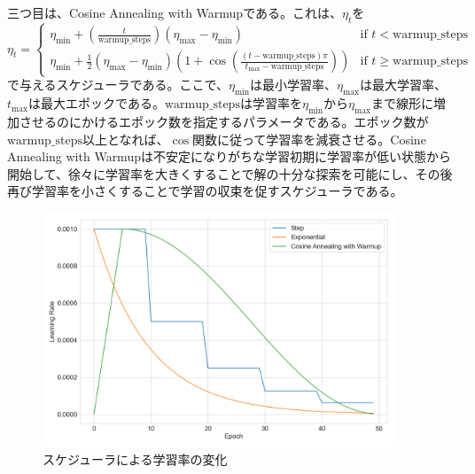 \documentclass[12pt]{jarticle}
\numberwithin{equation}{section}    %
\numberwithin{figure}{section}      %
\numberwithin{table}{section}      %
\begin{document}
三つ目は、Cosine Annealing with Warmupである。これは、$\eta_{t}$を
\begin{equation}
    \eta_{t} =
    \begin{cases}
        \eta_{\text{min}} + \left( \frac{t}{\text{warmup\_steps}} \right) (\eta_{\text{max}} - \eta_{\text{min}})                                                                                  & \text{if $t < \text{warmup\_steps}$}   \\
        \eta_{\text{min}} + \frac{1}{2} (\eta_{\text{max}} - \eta_{\text{min}}) \left( 1 + \cos \left( \frac{(t - \text{warmup\_steps})\pi}{t_{\text{max}} - \text{warmup\_steps}} \right) \right) & \text{if $t \ge \text{warmup\_steps}$}
    \end{cases}
\end{equation}
で与えるスケジューラである。ここで、$\eta_{\text{min}}$は最小学習率、$\eta_{\text{max}}$は最大学習率、$t_{\text{max}}$は最大エポックである。$\text{warmup\_steps}$は学習率を$\eta_{\text{min}}$から$\eta_{\text{max}}$まで線形に増加させるのにかけるエポック数を指定するパラメータである。エポック数が$\text{warmup\_steps}$以上となれば、$\cos$関数に従って学習率を減衰させる。Cosine Annealing with Warmupは不安定になりがちな学習初期に学習率が低い状態から開始して、徐々に学習率を大きくすることで解の十分な探索を可能にし、その後再び学習率を小さくすることで学習の収束を促すスケジューラである。

\begin{figure}[bt]
    \centering
    \includegraphics[height=70mm]{./figure/sec3/lr_scheduler.png}
    \caption{スケジューラによる学習率の変化}
    \label{sec3:fig:lr_scheduler}
\end{figure}
\end{document}
